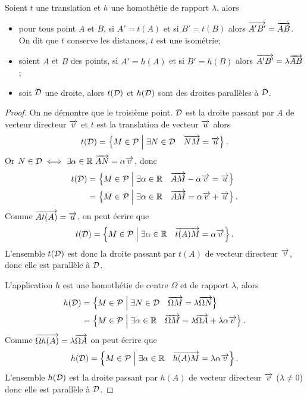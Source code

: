 \begin{prop}
  Soient \(t\) une translation et \(h\) une homothétie de rapport \(\lambda\), alors
  \begin{itemize}
  \item pour tous point \(A\) et \(B\), si \(A'=t(A)\) et si \(B'=t(B)\) alors \(\overrightarrow{A'B'}=\overrightarrow{AB}\). On dit que \(t\) conserve les distances, \(t\) est une isométrie;
  \item soient \(A\) et \(B\) des points, si \(A'=h(A)\) et si \(B'=h(B)\) alors \(\overrightarrow{A'B'}=\lambda\overrightarrow{AB}\);
  \item soit \(\mathcal{D}\) une droite, alors \(t(\mathcal{D})\) et \(h(\mathcal{D})\) sont des droites parallèles à \(\mathcal{D}\).
  \end{itemize}
\end{prop}
\begin{proof} On ne démontre que le troisième point. \(\mathcal{D}\) est la droite passant par \(A\) de vecteur directeur \(\overrightarrow{v}\) et \(t\) est la translation de vecteur \(\overrightarrow{u}\) alors
  \begin{equation}
    t(\mathcal{D})=\left\{M \in \mathcal{P}\mathrel{}\middle|\mathrel{}\exists N \in \mathcal{D} \quad \overrightarrow{NM}=\overrightarrow{u}\right\}.
  \end{equation}
Or \(N \in \mathcal{D} \iff \exists \alpha \in \mathbb{R} \ \overrightarrow{AN}=\alpha \overrightarrow{v}\), donc
\begin{align}
    t(\mathcal{D})&=\left\{M \in \mathcal{P}\mathrel{}\middle|\mathrel{}\exists \alpha \in \mathbb{R} \quad \overrightarrow{AM}-\alpha \overrightarrow{v}=\overrightarrow{u}\right\}\\
    &=\left\{M \in \mathcal{P}\mathrel{}\middle|\mathrel{}\exists \alpha \in \mathbb{R} \quad \overrightarrow{AM}=\alpha \overrightarrow{v}+\overrightarrow{u}\right\}.
  \end{align}
  Comme \(\overrightarrow{At(A)}=\overrightarrow{u}\), on peut écrire que 
\begin{equation}
  t(\mathcal{D})=\left\{M \in \mathcal{P}\mathrel{}\middle|\mathrel{}\exists \alpha \in \mathbb{R} \quad \overrightarrow{t(A)M}=\alpha \overrightarrow{v}\right\}.
\end{equation}
L'ensemble \(t(\mathcal{D})\) est donc la droite passant par \(t(A)\) de vecteur directeur \(\overrightarrow{v}\), donc elle est parallèle à \(\mathcal{D}\).

L'application \(h\) est une homothétie de centre \(\Omega\) et de rapport \(\lambda\), alors
\begin{align}
  h(\mathcal{D})&=\left\{M \in \mathcal{P}\mathrel{}\middle|\mathrel{}\exists N \in \mathcal{D} \quad \overrightarrow{\Omega M}=\lambda \overrightarrow{\Omega N}\right\}\\
    &=\left\{M \in \mathcal{P}\mathrel{}\middle|\mathrel{}\exists \alpha \in \mathbb{R} \quad \overrightarrow{\Omega M}=\lambda \overrightarrow{\Omega A}+\lambda\alpha \overrightarrow{v}\right\}.
\end{align}
Comme \(\overrightarrow{\Omega h(A)}=\lambda \overrightarrow{\Omega A}\) on peut écrire que 
\begin{equation}
  h(\mathcal{D})=\left\{M \in \mathcal{P}\mathrel{}\middle|\mathrel{}\exists \alpha \in \mathbb{R} \quad \overrightarrow{h(A) M}=\lambda\alpha \overrightarrow{v}\right\}.
\end{equation}
L'ensemble \(h(\mathcal{D})\) est la droite passant par \(h(A)\) de vecteur directeur \(\overrightarrow{v}\) (\(\lambda \neq 0\)) donc elle est parallèle à \(\mathcal{D}\).
\end{proof}
